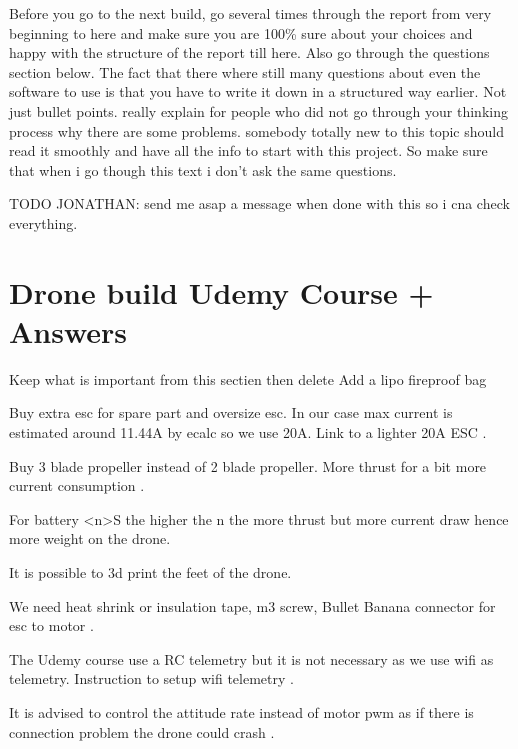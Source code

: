 Before you go to the next build, go several times through the report from very beginning to here and make sure you are 100\% sure about your choices and happy with the structure of the report till here. Also go through the questions section below. The fact that there where still many questions about even the software to use is that you have to write it down in a structured way earlier. Not just bullet points. really explain for people who did not go through your thinking process why there are some problems. somebody totally new to this topic should read it smoothly and have all the info to start with this project. So make sure that when i go though this text i don't ask the same questions.

{\color{red}TODO JONATHAN: send me asap a message when done with this so i cna check everything. \\}

\section{Drone build Udemy Course + Answers}
 {\color{red} Keep what is important from this sectien then delete}
Add a lipo fireproof bag

Buy extra esc for spare part and oversize esc. In our case max current is estimated around 11.44A by ecalc so we use 20A. Link to a lighter 20A ESC \cite{bangood_racerstar}.

Buy 3 blade propeller instead of 2 blade propeller. More thrust for a bit more current consumption \cite{bangood_propeller_3_blade}.

For battery <n>S the higher the n the more thrust but more current draw hence more weight on the drone.

It is possible to 3d print the feet of the drone.

We need heat shrink or insulation tape, m3 screw, Bullet Banana connector for esc to motor \cite{bangood_bullet_banana_connector}.

The Udemy course use a RC telemetry but it is not necessary as we use wifi as telemetry. Instruction to setup wifi telemetry \cite{emlid_ardupilot_installation}.


It is advised to control the attitude rate instead of motor pwm as if there is connection problem the drone could crash \cite{px4_low_level_control}.
